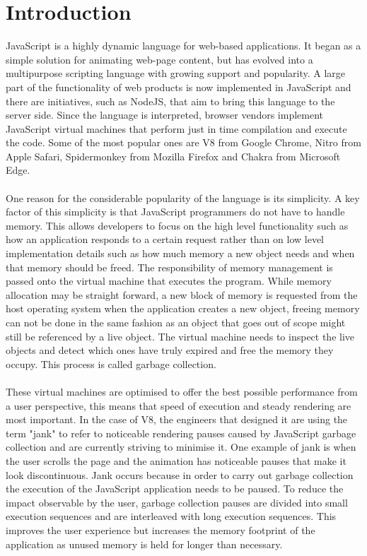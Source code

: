\documentclass[a4paper]{article}
\begin{document}
\section{Introduction}
JavaScript is a highly dynamic language for web-based applications.\cite{intro} 
It began as a simple solution for animating web-page content, but has evolved into a multipurpose scripting language with growing support and popularity. A large part of the functionality of web products is now implemented in JavaScript and there are initiatives, such as NodeJS\cite{nodejs}, that aim to bring this language to the server side. Since the language is interpreted, browser vendors implement JavaScript virtual machines that perform just in time compilation and execute the code. Some of the most popular ones are V8 from Google Chrome\cite{v8}, Nitro from Apple Safari, Spidermonkey\cite{spidermk} from Mozilla Firefox and Chakra\cite{chakra} from Microsoft Edge.
\\\\
One reason for the considerable popularity of the language is its simplicity. A key factor of this simplicity is that JavaScript programmers do not have to handle memory. This allows developers to focus on the high level functionality such as how an application responds to a certain request rather than on low level implementation details such as how much memory a new object needs and when that memory should be freed. The responsibility of memory management is passed onto the virtual machine that executes the program. While memory allocation may be straight forward, a new block of memory is requested from the host operating system when the application creates a new object, freeing memory can not be done in the same fashion as an object that goes out of scope might still be referenced by a live object. The virtual machine needs to inspect the live objects and detect which ones have truly expired and free the memory they occupy. This process is called garbage collection.  
\\\\
These virtual machines are optimised to offer the best possible performance from a user perspective, this means that speed of execution and steady rendering are most important. In the case of V8, the engineers that designed it are using the term "jank" to refer to noticeable rendering pauses caused by JavaScript garbage collection and are currently striving to minimise it. One example of jank is when the user scrolls the page and the animation has noticeable pauses that make it look discontinuous. Jank occurs because in order to carry out garbage collection the execution of the JavaScript application needs to be paused. To reduce the impact observable by the user, garbage collection pauses are divided into small execution sequences and are interleaved with long execution sequences. This improves the user experience but increases the memory footprint of the application as unused memory is held for longer than necessary.
\end{document}
